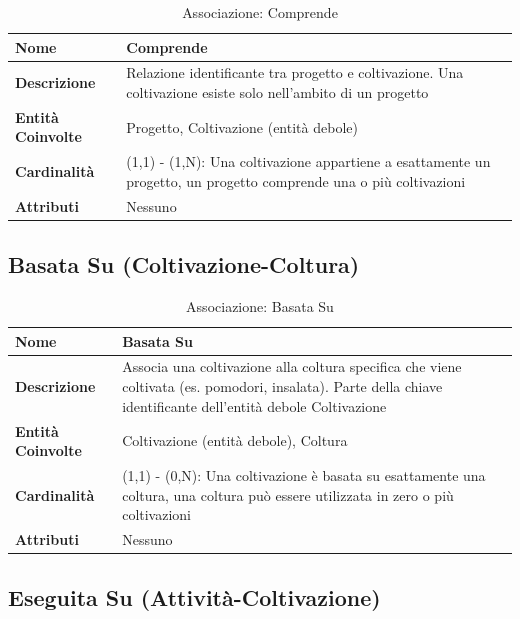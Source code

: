 \documentclass[12pt,a4paper]{article}
\begin{document}
\begin{table}[H]
\centering
\caption{Associazione: Comprende}
\begin{tabularx}{\textwidth}{|l|X|}
\hline
\textbf{Nome} & Comprende \\
\hline
\textbf{Descrizione} & Relazione identificante tra progetto e coltivazione. Una coltivazione esiste solo nell'ambito di un progetto \\
\hline
\textbf{Entità Coinvolte} & Progetto, Coltivazione (entità debole) \\
\hline
\textbf{Cardinalità} & (1,1) - (1,N): Una coltivazione appartiene a esattamente un progetto, un progetto comprende una o più coltivazioni \\
\hline
\textbf{Attributi} & Nessuno \\
\hline
\end{tabularx}
\end{table}

\subsection{Basata Su (Coltivazione-Coltura)}

\begin{table}[H]
\centering
\caption{Associazione: Basata Su}
\begin{tabularx}{\textwidth}{|l|X|}
\hline
\textbf{Nome} & Basata Su \\
\hline
\textbf{Descrizione} & Associa una coltivazione alla coltura specifica che viene coltivata (es. pomodori, insalata). Parte della chiave identificante dell'entità debole Coltivazione \\
\hline
\textbf{Entità Coinvolte} & Coltivazione (entità debole), Coltura \\
\hline
\textbf{Cardinalità} & (1,1) - (0,N): Una coltivazione è basata su esattamente una coltura, una coltura può essere utilizzata in zero o più coltivazioni \\
\hline
\textbf{Attributi} & Nessuno \\
\hline
\end{tabularx}
\end{table}

\subsection{Eseguita Su (Attività-Coltivazione)}
\end{document}
